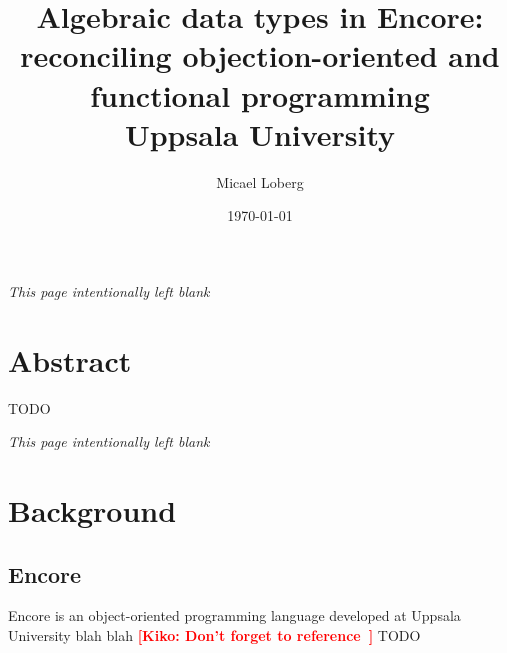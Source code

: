 \documentclass[10pt]{report}
\title{
    {Algebraic data types in Encore:}\\
    {reconciling objection-oriented and functional programming}\\
    {Uppsala University}
}
\author{Micael Loberg}
\date{\today}
\newcommand{\KIKO}[1]{\textcolor{red}{\textbf{[Kiko: #1]}}}
\begin{document}

\maketitle

\newpage\newpage
{\centering \textit{This page intentionally left blank}\par}
\vspace{\fill}


\chapter*{Abstract}
TODO

\newpage\newpage
{\centering \textit{This page intentionally left blank}\par}
\vspace{\fill}


\tableofcontents

%
\chapter{Background}
%
\setcounter{page}{1}

%
\label{ch:background}
%

\section{Encore}
Encore is an object-oriented programming language developed at Uppsala University blah blah
\KIKO{Don't forget to reference~\cite{brandauer:2015:POM}}
TODO
\end{document}
